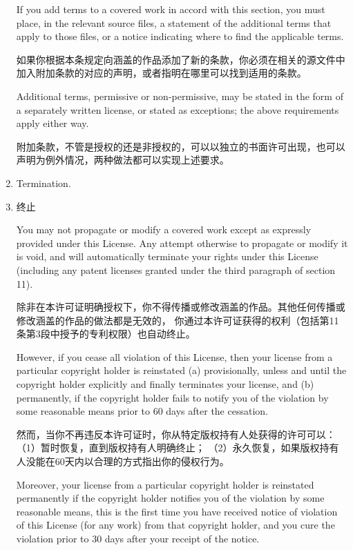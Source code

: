 \documentclass[11pt]{article}
\begin{document}
\begin{enumerate}
        If you add terms to a covered work in accord with this section, you
        must place, in the relevant source files, a statement of the
        additional terms that apply to those files, or a notice indicating
        where to find the applicable terms.

        如果你根据本条规定向涵盖的作品添加了新的条款，你必须在相关的源文件中加入附加条款的对应的声明，或者指明在哪里可以找到适用的条款。

        Additional terms, permissive or non-permissive, may be stated in the
        form of a separately written license, or stated as exceptions;
        the above requirements apply either way.

        附加条款，不管是授权的还是非授权的，可以以独立的书面许可出现，也可以声明为例外情况，两种做法都可以实现上述要求。

  \item Termination.
  \item 终止

        You may not propagate or modify a covered work except as expressly
        provided under this License.  Any attempt otherwise to propagate or
        modify it is void, and will automatically terminate your rights under
        this License (including any patent licenses granted under the third
        paragraph of section 11).

        除非在本许可证明确授权下，你不得传播或修改涵盖的作品。其他任何传播或修改涵盖的作品的做法都是无效的，
        你通过本许可证获得的权利（包括第11条第3段中授予的专利权限）也自动终止。

        However, if you cease all violation of this License, then your
        license from a particular copyright holder is reinstated (a)
        provisionally, unless and until the copyright holder explicitly and
        finally terminates your license, and (b) permanently, if the copyright
        holder fails to notify you of the violation by some reasonable means
        prior to 60 days after the cessation.

        然而，当你不再违反本许可证时，你从特定版权持有人处获得的许可可以：（1）暂时恢复，直到版权持有人明确终止；
        （2）永久恢复，如果版权持有人没能在60天内以合理的方式指出你的侵权行为。

        Moreover, your license from a particular copyright holder is
        reinstated permanently if the copyright holder notifies you of the
        violation by some reasonable means, this is the first time you have
        received notice of violation of this License (for any work) from that
        copyright holder, and you cure the violation prior to 30 days after
        your receipt of the notice.


\end{enumerate}
\end{document}
